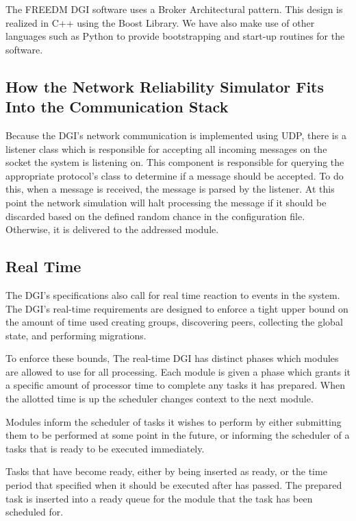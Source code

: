 The FREEDM DGI software uses a Broker Architectural pattern. This design is 
realized in C++ using the Boost Library\cite{BOOST}. We have also make use of 
other languages such as Python to provide bootstrapping and start-up routines 
for the software.

\subsection{How the Network Reliability Simulator Fits Into the Communication 
Stack}

Because the DGI's network communication is implemented using UDP, there is a 
listener class which is responsible for accepting all incoming messages on the 
socket the system is listening on. This component is responsible for querying 
the appropriate protocol's class to determine
if a message should be accepted. To do this, when a message is received, the 
message is parsed by the listener. At this point the network simulation will 
halt processing the  message if it should be discarded based on the defined 
random chance in the configuration file. Otherwise, it is delivered to the 
addressed module.

\subsection{Real Time}
The DGI's specifications also call for real time reaction to events in the
system. The DGI's real-time requirements are designed to enforce a tight
upper bound on the amount of time used creating groups, discovering peers,
collecting the global state, and performing migrations.

To enforce these bounds, The real-time DGI has distinct phases which modules
are allowed to use for all processing. Each module is given a phase which
grants it a specific amount of processor time to complete any tasks it has
prepared. When the allotted time is up the scheduler changes context to the
next module.

Modules inform the scheduler of tasks it wishes to perform by either submitting
them to be performed at some point in the future, or informing the scheduler of
a tasks that is ready to be executed immediately.

Tasks that have become ready, either by being inserted as ready, or the time
period that specified when it should be executed after has passed. The prepared
task is inserted into a ready queue for the module that the task has been
scheduled for.

